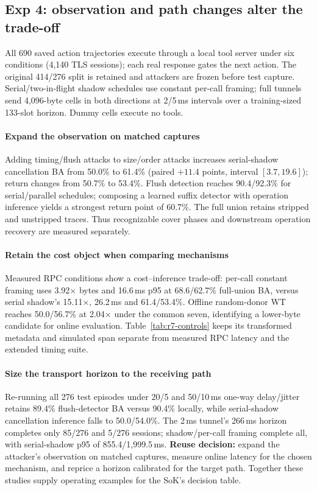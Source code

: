 \subsection{Exp 4: observation and path changes alter the trade-off}\label{sec:live-timing}\label{sec:r7-main}
All 690 saved action trajectories execute through a local tool server under six conditions (4,140 TLS sessions); each real response gates the next action. The original 414/276 split is retained and attackers are frozen before test capture. Serial/two-in-flight shadow schedules use constant per-call framing; full tunnels send 4,096-byte cells in both directions at 2/5\,ms intervals over a training-sized 133-slot horizon. Dummy cells execute no tools.


\paragraph{Expand the observation on matched captures}
Adding timing/flush attacks to size/order attacks increases serial-shadow cancellation BA from 50.0\% to 61.4\% (paired $+11.4$ points, interval $[3.7,19.6]$); return changes from 50.7\% to 53.4\%. Flush detection reaches 90.4/92.3\% for serial/parallel schedules; composing a learned suffix detector with operation inference yields a strongest return point of 60.7\%. The full union retains stripped and unstripped traces. Thus recognizable cover phases and downstream operation recovery are measured separately.

\paragraph{Retain the cost object when comparing mechanisms}
Measured RPC conditions show a cost--inference trade-off: per-call constant framing uses 3.92$\times$ bytes and 16.6\,ms p95 at 68.6/62.7\% full-union BA, versus serial shadow's 15.11$\times$, 26.2\,ms and 61.4/53.4\%. Offline random-donor WT reaches 50.0/56.7\% at 2.04$\times$ under the common seven, identifying a lower-byte candidate for online evaluation. Table~\ref{tab:r7-controls} keeps its transformed metadata and simulated span separate from measured RPC latency and the extended timing suite.

\paragraph{Size the transport horizon to the receiving path}
Re-running all 276 test episodes under 20/5 and 50/10\,ms one-way delay/jitter retains 89.4\% flush-detector BA versus 90.4\% locally, while serial-shadow cancellation inference falls to 50.0/54.0\%. The 2\,ms tunnel's 266\,ms horizon completes only 85/276 and 5/276 sessions; shadow/per-call framing complete all, with serial-shadow p95 of 855.4/1,999.5\,ms. \textbf{Reuse decision:} expand the attacker's observation on matched captures, measure online latency for the chosen mechanism, and reprice a horizon calibrated for the target path. Together these studies supply operating examples for the SoK's decision table.
